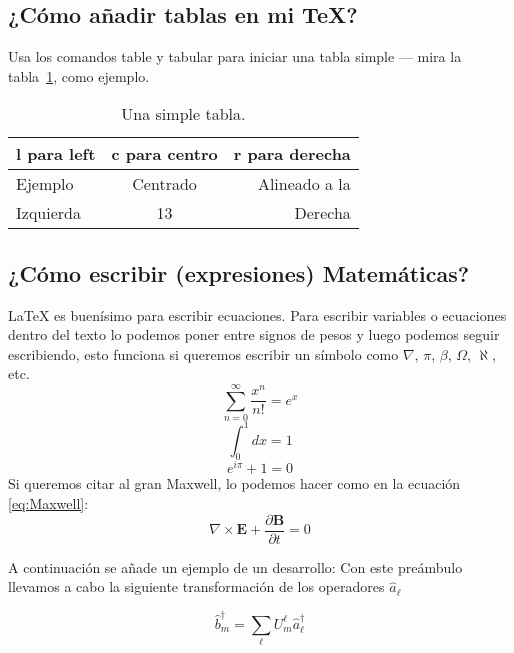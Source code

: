 \documentclass[a4paper]{article}
\begin{document}

\subsection{¿Cómo añadir tablas en mi \TeX?}

Usa los comandos table y tabular para iniciar una tabla simple --- mira la tabla~\ref{tab:tabla ejemplo}, como ejemplo. 

\begin{table}
\centering
\begin{tabular}{l c r} 
l para left & c para centro & r para derecha \\ \hline
Ejemplo & Centrado & Alineado a la\\
Izquierda & 13 & Derecha
\end{tabular}
\caption{\label{tab:tabla ejemplo}Una simple tabla.}
\end{table}

\subsection{¿Cómo escribir (expresiones) Matemáticas?}

\LaTeX{} es buenísimo para escribir ecuaciones. Para escribir variables o ecuaciones dentro del texto lo podemos poner entre signos de pesos y luego podemos seguir escribiendo, esto funciona si queremos escribir un símbolo como $\nabla$, $\pi$, $\beta$, $\Omega$, $\aleph$, etc.
\begin{equation}
\sum_{n=0}^\infty \frac{x^n}{n!}=e^x
\end{equation}
\begin{equation}
\int_{0}^{1}dx=1
\end{equation}
\begin{equation}
e^{i\pi}+1=0
\end{equation}
Si queremos citar al gran Maxwell, lo podemos hacer como en la ecuación \ref{eq:Maxwell}:
\begin{equation}
\nabla\times\mathbf{E}+\frac{\partial\mathbf{B}}{\partial t}=0\label{eq:Maxwell}
\end{equation}

A continuación se añade un ejemplo de un desarrollo:
Con este preámbulo llevamos a cabo la siguiente transformación de los operadores $\hat{a}_{\ell}$

\begin{equation}
\hat{b}_{m}^{\dagger}=\sum_{\ell}U_{m}^{\ell}\hat{a}_{\ell}^{\dagger}
\end{equation}
\end{document}
